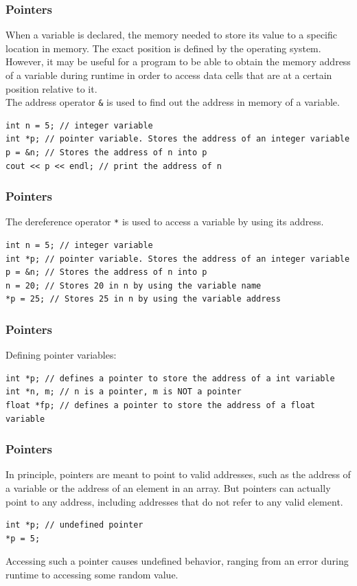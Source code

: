 \begin{frame}[fragile]
\frametitle{Pointers}
When a variable is declared, the memory needed to store its value to a specific location in memory.
The exact position is defined by the operating system. However, it may be useful for a program to be
able to obtain the memory address of a variable during runtime in order to access data cells that
are at a certain position relative to it.\\
\vspace{3mm}
The address operator \verb|&| is used to find out the address in memory of a variable.

{\tiny
\begin{lstlisting}
int n = 5; // integer variable
int *p; // pointer variable. Stores the address of an integer variable
p = &n; // Stores the address of n into p
cout << p << endl; // print the address of n
\end{lstlisting}
}
\end{frame}

\begin{frame}[fragile]
\frametitle{Pointers}
The dereference operator \verb|*| is used to access a variable by using its address.

{\tiny
\begin{lstlisting}
int n = 5; // integer variable
int *p; // pointer variable. Stores the address of an integer variable
p = &n; // Stores the address of n into p
n = 20; // Stores 20 in n by using the variable name
*p = 25; // Stores 25 in n by using the variable address
\end{lstlisting}
}
\end{frame}

\begin{frame}[fragile]
\frametitle{Pointers}
Defining pointer variables:
{\tiny
\begin{lstlisting}
int *p; // defines a pointer to store the address of a int variable
int *n, m; // n is a pointer, m is NOT a pointer
float *fp; // defines a pointer to store the address of a float variable
\end{lstlisting}
}
\end{frame}

\begin{frame}[fragile]
\frametitle{Pointers}
In principle, pointers are meant to point to valid addresses,
such as the address of a variable or the address of an element in an array.
But pointers can actually point to any address,
including addresses that do not refer to any valid element. 
{\tiny
\begin{lstlisting}
int *p; // undefined pointer
*p = 5;
\end{lstlisting}
}
Accessing such a pointer causes undefined behavior,
ranging from an error during runtime to accessing some random value.
\end{frame}

